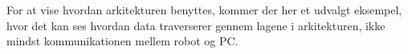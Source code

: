 
For at vise hvordan arkitekturen benyttes, kommer der her et udvalgt eksempel, hvor det kan ses hvordan data traverserer gennem lagene i arkitekturen, ikke mindst kommunikationen mellem robot og PC.

